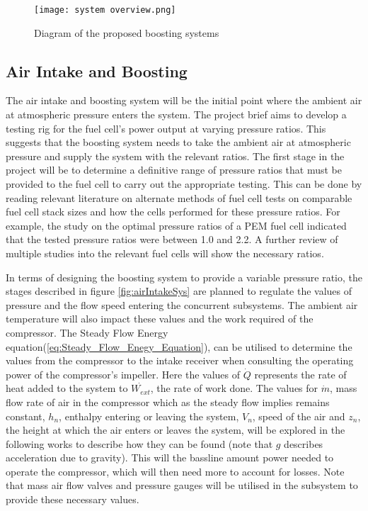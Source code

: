 \documentclass[a4paper,11pt]{article}
\begin{document}
\begin{figure}[h] 
    \texttt{[image: system overview.png]}
    \caption{Diagram of the proposed boosting systems}
    \centering  
    \label{fig:systemOverview}
\end{figure}

\subsection{Air Intake and Boosting}
The air intake and boosting system will be the initial point where the ambient air at atmospheric pressure enters the system. The project brief aims to develop a testing rig for the fuel cell's power output at varying pressure ratios. This suggests that the boosting system needs to take the ambient air at atmospheric pressure and supply the system with the relevant ratios. The first stage in the project will be to determine a definitive range of pressure ratios that must be provided to the fuel cell to carry out the appropriate testing. This can be done by reading relevant literature on alternate methods of fuel cell tests on comparable fuel cell stack sizes and how the cells performed for these pressure ratios. For example, the study on the optimal pressure ratios of a PEM fuel cell\cite{hoeflinger2020air} indicated that the tested pressure ratios were between 1.0 and 2.2. A further review of multiple studies into the relevant fuel cells will show the necessary ratios.

In terms of designing the boosting system to provide a variable pressure ratio, the stages described in figure \ref{fig:airIntakeSys} are planned to regulate the values of pressure and the flow speed entering the concurrent subsystems. The ambient air temperature will also impact these values and the work required of the compressor. The Steady Flow Energy equation(\ref{eq:Steady_Flow_Enegy_Equation}), can be utilised to determine the values from the compressor to the intake receiver when consulting the operating power of the compressor's impeller. Here the values of $\dot{Q}$ represents the rate of heat added to the system to $\dot{W_{ext}}$, the rate of work done. The values for $\dot{m}$, mass flow rate of air in the compressor which as the steady flow implies remains constant, $h_n$, enthalpy entering or leaving the system, $V_n$, speed of the air and $z_n$, the height at which the air enters or leaves the system, will be explored in the following works to describe how they can be found (note that $g$ describes acceleration due to gravity). This will the bassline amount power needed to operate the compressor, which will then need more to account for losses. Note that mass air flow valves and pressure gauges will be utilised in the subsystem to provide these necessary values. 
\end{document}
